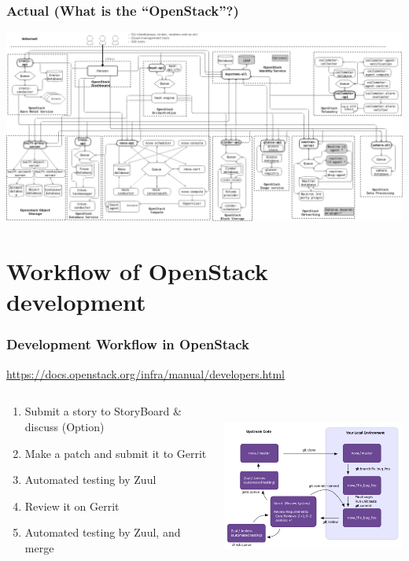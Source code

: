 \documentclass[aspectratio=169,11pt,hyperref={colorlinks=true}]{beamer}
\begin{document}
\begin{frame}
  \frametitle{Actual (What is the ``OpenStack''?)}
  \begin{center}
    \includegraphics[width=1.0\textwidth]{images/openstack-arch-kilo-logical-v1.png}
  \end{center}
\end{frame}

\section{Workflow of OpenStack development}
\begin{frame}
  \frametitle{Development Workflow in OpenStack}
  \url{https://docs.openstack.org/infra/manual/developers.html}
  \begin{columns}[T]
    \begin{column}{0.4\textwidth}
      \begin{enumerate}
        \item Submit a story to StoryBoard \& discuss (Option)
        \item Make a patch and submit it to Gerrit
        \item Automated testing by Zuul
        \item Review it on Gerrit
        \item Automated testing by Zuul, and merge
      \end{enumerate}
    \end{column}
    \begin{column}{0.6\textwidth}
      \centering\includegraphics[height=55mm]{images/code_review.png}
    \end{column}
  \end{columns}
\end{frame}
\end{document}
